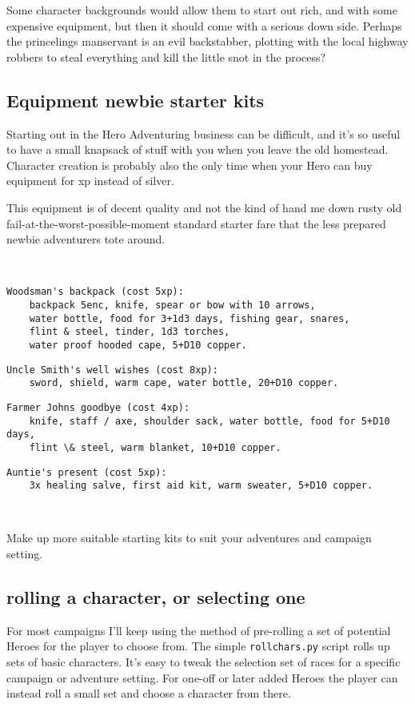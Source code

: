Some character backgrounds would allow them to start out rich, and with some expensive equipment, but then it should come with a serious down side. Perhaps the princelings manservant is an evil backstabber, plotting with the local highway robbers to steal everything and kill the little snot in the process?


\subsection*{Equipment newbie starter kits}
Starting out in the Hero Adventuring business can be difficult, and it's so useful to have a small knapsack of stuff with you when you leave the old homestead. Character creation is probably also the only time when your Hero can buy equipment for xp instead of silver.

This equipment is of decent quality and not the kind of hand me down rusty old fail-at-the-worst-possible-moment standard starter fare that the less prepared newbie adventurers tote around.

\

\goodbreak \small \begin{samepage} \begin{verbatim}
Woodsman's backpack (cost 5xp):
    backpack 5enc, knife, spear or bow with 10 arrows,
    water bottle, food for 3+1d3 days, fishing gear, snares,
    flint & steel, tinder, 1d3 torches,
    water proof hooded cape, 5+D10 copper.
\end{verbatim}\goodbreak\begin{verbatim}
Uncle Smith's well wishes (cost 8xp):
    sword, shield, warm cape, water bottle, 20+D10 copper.
\end{verbatim}\goodbreak\begin{verbatim}
Farmer Johns goodbye (cost 4xp):
    knife, staff / axe, shoulder sack, water bottle, food for 5+D10 days,
    flint \& steel, warm blanket, 10+D10 copper.
\end{verbatim}\goodbreak\begin{verbatim}
Auntie's present (cost 5xp):
    3x healing salve, first aid kit, warm sweater, 5+D10 copper.
\end{verbatim} \end{samepage} \normalsize

\

\noindent Make up more suitable starting kits to suit your adventures and campaign setting.


\subsection*{rolling a character, or selecting one}
For most campaigns I'll keep using the method of pre-rolling a set of potential Heroes for the player to choose from. The simple \verb|rollchars.py| script rolls up sets of basic characters. It's easy to tweak the selection set of races for a specific campaign or adventure setting.
For one-off or later added Heroes the player can instead roll a small set and choose a character from there.


